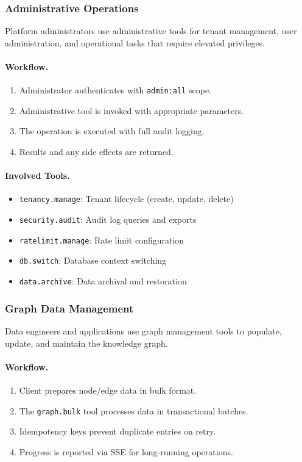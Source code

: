 \subsubsection{Administrative Operations}

Platform administrators use administrative tools for tenant management, user administration, and operational tasks that require elevated privileges.

\paragraph{Workflow.}
\begin{enumerate}
    \item Administrator authenticates with \texttt{admin:all} scope.
    \item Administrative tool is invoked with appropriate parameters.
    \item The operation is executed with full audit logging.
    \item Results and any side effects are returned.
\end{enumerate}

\paragraph{Involved Tools.}
\begin{itemize}
    \item \texttt{tenancy.manage}: Tenant lifecycle (create, update, delete)
    \item \texttt{security.audit}: Audit log queries and exports
    \item \texttt{ratelimit.manage}: Rate limit configuration
    \item \texttt{db.switch}: Database context switching
    \item \texttt{data.archive}: Data archival and restoration
\end{itemize}

\subsubsection{Graph Data Management}

Data engineers and applications use graph management tools to populate, update, and maintain the knowledge graph.

\paragraph{Workflow.}
\begin{enumerate}
    \item Client prepares node/edge data in bulk format.
    \item The \texttt{graph.bulk} tool processes data in transactional batches.
    \item Idempotency keys prevent duplicate entries on retry.
    \item Progress is reported via SSE for long-running operations.
\end{enumerate}

